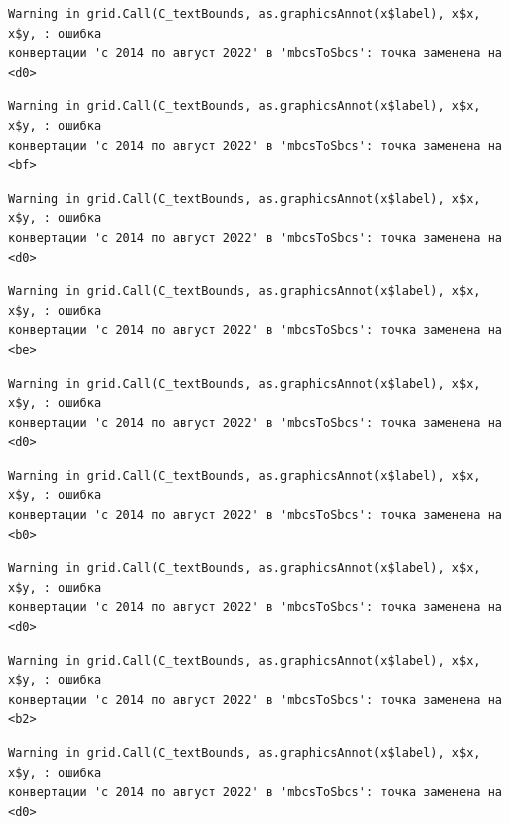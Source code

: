 \documentclass[
  letterpaper,
  DIV=11,
  numbers=noendperiod]{scrreprt}
\begin{document}
\begin{verbatim}
Warning in grid.Call(C_textBounds, as.graphicsAnnot(x$label), x$x, x$y, : ошибка
конвертации 'с 2014 по август 2022' в 'mbcsToSbcs': точка заменена на <d0>
\end{verbatim}

\begin{verbatim}
Warning in grid.Call(C_textBounds, as.graphicsAnnot(x$label), x$x, x$y, : ошибка
конвертации 'с 2014 по август 2022' в 'mbcsToSbcs': точка заменена на <bf>
\end{verbatim}

\begin{verbatim}
Warning in grid.Call(C_textBounds, as.graphicsAnnot(x$label), x$x, x$y, : ошибка
конвертации 'с 2014 по август 2022' в 'mbcsToSbcs': точка заменена на <d0>
\end{verbatim}

\begin{verbatim}
Warning in grid.Call(C_textBounds, as.graphicsAnnot(x$label), x$x, x$y, : ошибка
конвертации 'с 2014 по август 2022' в 'mbcsToSbcs': точка заменена на <be>
\end{verbatim}

\begin{verbatim}
Warning in grid.Call(C_textBounds, as.graphicsAnnot(x$label), x$x, x$y, : ошибка
конвертации 'с 2014 по август 2022' в 'mbcsToSbcs': точка заменена на <d0>
\end{verbatim}

\begin{verbatim}
Warning in grid.Call(C_textBounds, as.graphicsAnnot(x$label), x$x, x$y, : ошибка
конвертации 'с 2014 по август 2022' в 'mbcsToSbcs': точка заменена на <b0>
\end{verbatim}

\begin{verbatim}
Warning in grid.Call(C_textBounds, as.graphicsAnnot(x$label), x$x, x$y, : ошибка
конвертации 'с 2014 по август 2022' в 'mbcsToSbcs': точка заменена на <d0>
\end{verbatim}

\begin{verbatim}
Warning in grid.Call(C_textBounds, as.graphicsAnnot(x$label), x$x, x$y, : ошибка
конвертации 'с 2014 по август 2022' в 'mbcsToSbcs': точка заменена на <b2>
\end{verbatim}

\begin{verbatim}
Warning in grid.Call(C_textBounds, as.graphicsAnnot(x$label), x$x, x$y, : ошибка
конвертации 'с 2014 по август 2022' в 'mbcsToSbcs': точка заменена на <d0>
\end{verbatim}
\end{document}
